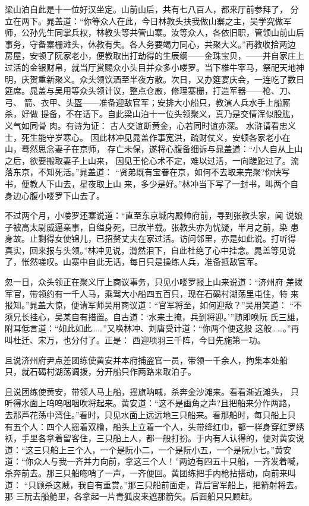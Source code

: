 梁山泊自此是十一位好汉坐定。山前山后，共有七八百人，都来厅前参拜了，
分立在两下。晁盖道：“你等众人在此，今日林教头扶我做山寨之主，吴学究做军
师，公孙先生同掌兵权，林教头等共管山寨。汝等众人，各依旧职，管领山前山后
事务，守备寨栅滩头，休教有失。各人务要竭力同心，共聚大义。”再教收拾两边
房屋，安顿了阮家老小，便教取出打劫得的生辰纲——金珠宝贝，——并自家庄上
过活的金银财帛，就当厅赏赐众小头目并众多小喽罗。当下椎牛宰马，祭祀天地神
明，庆贺重新聚义。众头领饮酒至半夜方散。次日，又办筵宴庆会，一连吃了数日
筵席。晁盖与吴用等众头领计议，整点仓廒，修理寨栅，打造军器——枪、刀、弓、
箭、衣甲、头盔——准备迎敌官军；安排大小船只，教演人兵水手上船厮杀，好做
提备，不在话下。自此梁山泊十一位头领聚义，真乃是交情浑似股肱，义气如同骨
肉。有诗为证：
古人交谊断黄金，心若同时谊亦深。
水浒请看忠义士，死生能守岁寒心。
因此林冲见晁盖作事宽洪，疏财仗义，安顿各家老小在山，蓦然思念妻子在京师，
存亡未保，遂将心腹备细诉与晁盖道：“小人自从上山之后，欲要搬取妻子上山来，
因见王伦心术不定，难以过活，一向蹉跎过了。流落东京，不知死活。”晁盖道：
“贤弟既有宝眷在京，如何不去取来完聚?你快写书，便教人下山去，星夜取上山
来，多少是好。”林冲当下写了一封书，叫两个自身边心腹小喽罗下山去了。

不过两个月，小喽罗还寨说道：“直至东京城内殿帅府前，寻到张教头家，闻
说娘子被高太尉威逼亲事，自缢身死，已故半载。张教头亦为忧疑，半月之前，染
患身故。止剩得女使锦儿，已招赘丈夫在家过活。访问邻里，亦是如此说。打听得
真实，回来报与头领。”林冲见说，潸然泪下，自此杜绝了心中挂念。晁盖等见说
了，怅然嗟叹。山寨中自此无话，每日只是操练人兵，准备抵敌官军。

忽一日，众头领正在聚义厅上商议事务，只见小喽罗报上山来说道：“济州府
差拨军官，带领约有一千人马，乘驾大小船四五百只，现在石碣村湖荡里屯住，特
来报知。”晁盖大惊，便请军师吴用商议道：“官军将至，如何迎敌？”吴用笑道：
“不须兄长挂心，吴某自有措置。自古道：‘水来土掩，兵到将迎。’”随即唤阮
氏三雄，附耳低言道：“如此如此……”又唤林冲、刘唐受计道：“你两个便这般
这般……。”再叫杜迁、宋万，也分付了。正是：
西迎项羽三千阵，今日先施第一功。

且说济州府尹点差团练使黄安并本府捕盗官一员，带领一千余人，拘集本处船
只，就石碣村湖荡调拨，分开船只作两路来取泊子。

且说团练使黄安，带领人马上船，摇旗呐喊，杀奔金沙滩来。看看渐近滩头，
只听得水面上呜呜咽咽吹将起来。黄安道：“这不是画角之声?且把船来分作两路，
去那芦花荡中湾住。”看时，只见水面上远远地三只船来。看那船时，每只船上只
有五个人：四个人摇着双橹，船头上立着一个人，头带绛红巾，都一样身穿红罗绣
袄，手里各拿着留客住，三只船上人，都一般打扮。于内有人认得的，便对黄安说
道：“这三只船上三个人，一个是阮小二，一个是阮小五，一个是阮小七。”黄安
道：“你众人与我一齐并力向前，拿这三个人！”两边有四五十只船，一齐发着喊，
杀奔前去。那三只船唿哨了一声，一齐便回。黄团练把手内枪拈搭动，向前来叫道：
“只顾杀这贼，我自有重赏。”那三只船前面走，背后官军船上，把箭射将去。那
三阮去船舱里，各拿起一片青狐皮来遮那箭矢。后面船只只顾赶。

